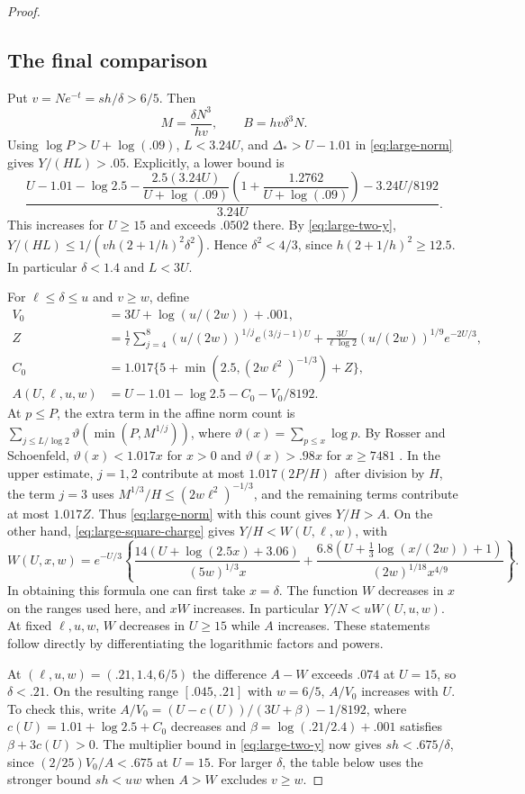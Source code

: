 \begin{proof}
\subsection*{The final comparison}

Put \(v=N e^{-t}=sh/\delta>6/5\). Then
\[
 M=\frac{\delta N^3}{hv},\qquad B=hv\delta^3N .
\]
Using \(\log P>U+\log(.09)\), \(L<3.24U\),
and \(\Delta_*>U-1.01\) in \eqref{eq:large-norm}
gives \(Y/(HL)>.05\). Explicitly, a lower bound is
\[
 \frac{U-1.01-\log2.5-
       \dfrac{2.5(3.24U)}{U+\log(.09)}
          \left(1+\dfrac{1.2762}{U+\log(.09)}\right)
       -3.24U/8192}{3.24U}.
\]
This increases for \(U\ge15\) and exceeds \(.0502\) there.
By \eqref{eq:large-two-y},
\(Y/(HL)\le 1/(v h(2+1/h)^2\delta^2)\). Hence
\(\delta^2<4/3\), since \(h(2+1/h)^2\ge12.5\).
In particular \(\delta<1.4\) and \(L<3U\).

For \(\ell\le\delta\le u\) and \(v\ge w\), define
\[
\begin{aligned}
 V_0&=3U+\log(u/(2w))+.001,\\
 Z&=\frac1\ell\sum_{j=4}^8(u/(2w))^{1/j}e^{(3/j-1)U}
       +\frac{3U}{\ell\log2}(u/(2w))^{1/9}e^{-2U/3},\\
 C_0&=1.017\{5+\min(2.5,(2w\ell^2)^{-1/3})+Z\},\\
 A(U,\ell,u,w)&=U-1.01-\log2.5-C_0-V_0/8192 .
\end{aligned}
\]
At \(p\le P\), the extra term in the affine norm count is
\(\sum_{j\le L/\log2}\vartheta(\min(P,M^{1/j}))\), where
\(\vartheta(x)=\sum_{p\le x}\log p\).
By Rosser and Schoenfeld,
\(\vartheta(x)<1.017x\) for \(x>0\) and
\(\vartheta(x)>.98x\) for \(x\ge7481\)
\cite[Theorems 9 and 10]{rosser-schoenfeld}.
In the upper estimate, \(j=1,2\) contribute at most
\(1.017(2P/H)\) after division by \(H\), the term \(j=3\)
uses \(M^{1/3}/H\le(2w\ell^2)^{-1/3}\), and the remaining
terms contribute at most \(1.017Z\).
Thus \eqref{eq:large-norm} with this count gives \(Y/H>A\).
On the other hand, \eqref{eq:large-square-charge} gives
\(Y/H<W(U,\ell,w)\), with
\[
 W(U,x,w)=e^{-U/3}\left\{
 \frac{14(U+\log(2.5x)+3.06)}{(5w)^{1/3}x}
 +\frac{6.8(U+\tfrac13\log(x/(2w))+1)}{(2w)^{1/18}x^{4/9}}
 \right\}.
\]
In obtaining this formula one can first take \(x=\delta\).
The function \(W\) decreases in \(x\) on the ranges used
here, and \(xW\) increases. In particular \(Y/N<uW(U,u,w)\).
At fixed \(\ell,u,w\), \(W\) decreases in \(U\ge15\)
while \(A\) increases. These statements follow directly
by differentiating the logarithmic factors and powers.

At \((\ell,u,w)=(.21,1.4,6/5)\) the difference \(A-W\)
exceeds \(.074\) at \(U=15\), so \(\delta<.21\).
On the resulting range \([.045,.21]\) with \(w=6/5\),
\(A/V_0\) increases with \(U\). To check this, write
\(A/V_0=(U-c(U))/(3U+\beta)-1/8192\),
where \(c(U)=1.01+\log2.5+C_0\) decreases and
\(\beta=\log(.21/2.4)+.001\) satisfies \(\beta+3c(U)>0\).
The multiplier bound in \eqref{eq:large-two-y} now gives
\(sh<.675/\delta\), since \((2/25)V_0/A<.675\) at \(U=15\).
For larger \(\delta\), the table below uses the stronger
bound \(sh<uw\) when \(A>W\) excludes \(v\ge w\).


\end{proof}
